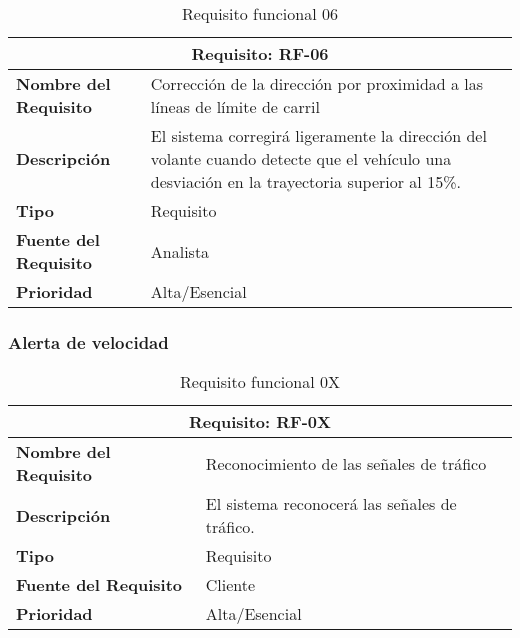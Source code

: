 \documentclass[10pt,a4paper,oldfontcommands]{dpds}
\begin{document}
\begin{table}[H]
\begin{center}
\begin{tabular}{p{} p{7cm}}
\multicolumn{2}{c}{\textbf{Requisito: RF-06} } \\
\hline \hline
\textbf{Nombre del Requisito} &  Corrección de la dirección por proximidad a las líneas de límite de carril\\
\textbf{Descripción} & El sistema corregirá ligeramente la dirección del volante cuando detecte que el vehículo una desviación en la trayectoria superior al 15\%. \\
\textbf{Tipo} & Requisito  \\
\textbf{Fuente del Requisito} & Analista  \\
\textbf{Prioridad} & Alta/Esencial  \\ \hline
\end{tabular}
\caption{Requisito funcional 06}
\label{tab:RF-06}
\end{center}
\end{table}


\subsubsection{Alerta de velocidad}

\begin{table}[H]
\begin{center}
\begin{tabular}{p{} p{7cm}}
\multicolumn{2}{c}{\textbf{Requisito: RF-0X} } \\
\hline \hline
\textbf{Nombre del Requisito} & Reconocimiento de las señales de tráfico \\
\textbf{Descripción} & El sistema reconocerá las señales de tráfico. \\
\textbf{Tipo} & Requisito  \\
\textbf{Fuente del Requisito} & Cliente  \\
\textbf{Prioridad} & Alta/Esencial  \\ \hline
\end{tabular}
\caption{Requisito funcional 0X}
\label{tab:personal}
\end{center}
\end{table}
\end{document}
